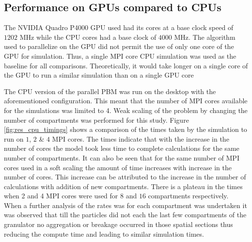 \documentclass[preprint,10pt,authoryear,review]{elsarticle}
\begin{document}
\subsection{Performance on GPUs compared to CPUs}
The NVIDIA Quadro P4000 GPU used had its cores at a base clock speed of $1202$ MHz while
the CPU cores had a base clock of $4000$ MHz. The algorithm used to parallelize on the GPU 
did not permit the use of only one core of the GPU for simulation. Thus, a single MPI core 
CPU simulation was used as the baseline for all comparisons. Theoretically, it would take 
longer on a single core of the GPU to run a similar simulation than on a single GPU core

The CPU version of the parallel PBM was run on the desktop with the aforementioned 
configuration. This meant that the number of MPI cores available for the simulations 
was limited to 4. Weak scaling of the problem by changing the number of compartments 
was performed for this study. Figure \ref{fig:res_cpu_timings} shows a comparison of the times taken 
by the simulation to run on $1$, $2$ \& $4$ MPI cores. The times indicate that 
with the increase in the number of cores the model took less time to complete 
calculations for the same number of compartments. It can also be seen that for the 
same number of MPI cores used in a soft scaling the amount of time increases 
with increase in the number of cores. This increase can be attributed to the 
increase in the number of calculations with addition of new compartments. There is a 
plateau in the times when 2 and 4 MPI cores were used for $8$ and $16$ compartments 
respectively. When a further analysis of the rates was for each compartment was undertaken 
it was observed that till the particles did not each the last few compartments of the 
granulator no aggregation or breakage occurred in those spatial sections thus reducing 
the compute time and leading to similar simulation times.
\end{document}
